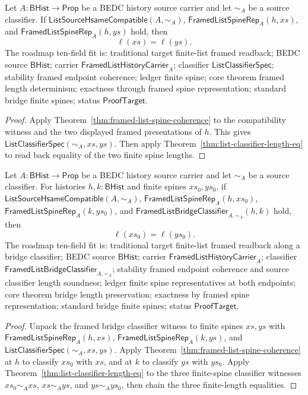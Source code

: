 \begin{theorem}
\label{thm:framed-list-spine-length-determinism}
Let $A:\mathsf{BHist}\to\mathsf{Prop}$ be a BEDC history source carrier and let
$\sim_A$ be a source classifier. If
$\mathsf{ListSourceHsameCompatible}(A,\sim_A)$,
$\mathsf{FramedListSpineRep}_A(h,xs)$, and
$\mathsf{FramedListSpineRep}_A(h,ys)$ hold, then
$$
\ell(xs)=\ell(ys).
$$
The roadmap ten-field fit is: traditional target finite-list framed readback; BEDC source $\mathsf{BHist}$; carrier $\mathsf{FramedListHistoryCarrier}_A$; classifier $\mathsf{ListClassifierSpec}$; stability framed endpoint coherence; ledger finite spine; core theorem framed length determinism; exactness through framed spine representation; standard bridge finite spines; status $\mathsf{ProofTarget}$.
\end{theorem}
\begin{proof}
Apply Theorem~\ref{thm:framed-list-spine-coherence} to the compatibility
witness and the two displayed framed presentations of $h$. This gives
$\mathsf{ListClassifierSpec}(\sim_A,xs,ys)$. Then apply
Theorem~\ref{thm:list-classifier-length-eq} to read back equality of the two
finite spine lengths.
\end{proof}

\begin{theorem}
\label{thm:framed-list-bridge-classifier-represented-length}
Let $A:\mathsf{BHist}\to\mathsf{Prop}$ be a BEDC history source carrier and let
$\sim_A$ be a source classifier. For histories $h,k:\mathsf{BHist}$ and finite
spines $xs_0,ys_0$, if $\mathsf{ListSourceHsameCompatible}(A,\sim_A)$,
$\mathsf{FramedListSpineRep}_A(h,xs_0)$,
$\mathsf{FramedListSpineRep}_A(k,ys_0)$, and
$\mathsf{FramedListBridgeClassifier}_{A,\sim_A}(h,k)$ hold, then
$$
\ell(xs_0)=\ell(ys_0).
$$
The roadmap ten-field fit is: traditional target finite-list framed readback along a bridge classifier; BEDC source $\mathsf{BHist}$; carrier $\mathsf{FramedListHistoryCarrier}_A$; classifier $\mathsf{FramedListBridgeClassifier}_{A,\sim_A}$; stability framed endpoint coherence and source classifier length soundness; ledger finite spine representatives at both endpoints; core theorem bridge length preservation; exactness by framed spine representation; standard bridge finite spines; status $\mathsf{ProofTarget}$.
\end{theorem}
\begin{proof}
Unpack the framed bridge classifier witness to finite spines $xs,ys$ with
$\mathsf{FramedListSpineRep}_A(h,xs)$,
$\mathsf{FramedListSpineRep}_A(k,ys)$, and
$\mathsf{ListClassifierSpec}(\sim_A,xs,ys)$. Apply
Theorem~\ref{thm:framed-list-spine-coherence} at $h$ to classify $xs_0$ with
$xs$, and at $k$ to classify $ys$ with $ys_0$. Apply
Theorem~\ref{thm:list-classifier-length-eq} to the three finite-spine classifier
witnesses $xs_0\sim_A xs$, $xs\sim_A ys$, and $ys\sim_A ys_0$, then chain the
three finite-length equalities.
\end{proof}
